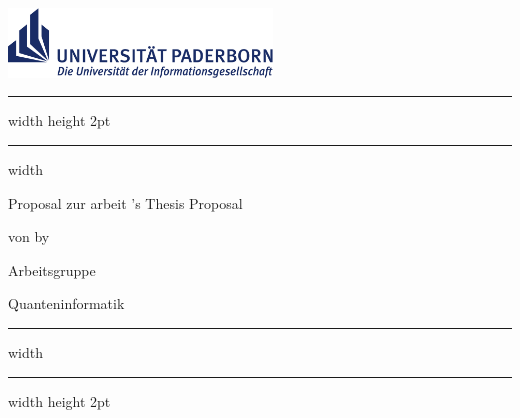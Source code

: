 
\thispagestyle{plain}

\includegraphics[width=7cm]{figures/upb_logo}

\bigskip

\hrule width \hsize height 2pt \kern 1mm \hrule width \hsize 
\vspace*{6pt}

\begin{center}
	\Large\textbf{\Title}
\end{center}

\begin{minipage}{6.5cm}
	\setlength{\parindent}{0pt}
	\large{
		\ifgerman
			Proposal zur \Degree arbeit
		\else
			\Degree 's Thesis Proposal
		\fi
	}
	
	\ifgerman
		\large von 
	\else
		\large by 
	\fi
	\Author
\end{minipage}
\begin{minipage}{8.1cm}
	\flushright
	\normalsize Arbeitsgruppe 
	
	Quanteninformatik
\end{minipage}

\bigskip

\hrule width \hsize \kern 1mm \hrule width \hsize height 2pt
